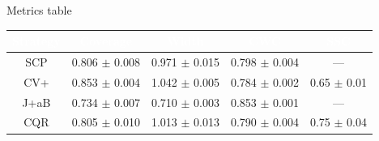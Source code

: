 \documentclass{beamer}
\renewcommand{\a}{\alpha}
\begin{document}
\begin{frame}{Metrics table}
\begin{table}[ht]
        \begin{subtable}{.5\textwidth}
            \hspace{-35mm}
            \begin{tabular}{|c|c|c|c|c|}
            \rowcolor{ColHead}\textcolor{white}{Strategy} & \textcolor{white}{Coverage} & \textcolor{white}{Width} & \textcolor{white}{CWC} & \textcolor{white}{SSC}\\ \hline
            \cellcolor{RowHead}SCP & 0.806 $\pm$ 0.008 & 0.971 $\pm$ 0.015 & 0.798 $\pm$ 0.004 & ---\\
            \cellcolor{RowHead}CV+ & 0.853 $\pm$ 0.004 & 1.042 $\pm$ 0.005 & 0.784 $\pm$ 0.002 & 0.65 $\pm$ 0.01\\
            \cellcolor{RowHead}J+aB & 0.734 $\pm$ 0.007 & 0.710 $\pm$ 0.003 & 0.853 $\pm$ 0.001 & --- %
            \\
            \cellcolor{RowHead}CQR & 0.805 $\pm$ 0.010 & 1.013 $\pm$ 0.013 & 0.790 $\pm$ 0.004 & 0.75 $\pm$ 0.04\\
            \hline
            \end{tabular}
        \end{subtable}
    \end{table}
\end{frame}

\end{document}

